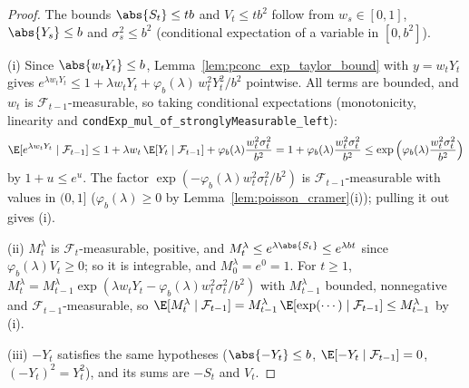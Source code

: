 \begin{proof}
\leanok
The bounds $\abs{S_t} \le tb$ and $V_t \le tb^2$ follow from $w_s \in [0, 1]$, $\abs{Y_s} \le b$
and $\sigma_s^2 \le b^2$ (conditional expectation of a variable in $[0, b^2]$).

(i) Since $\abs{w_t Y_t} \le b$, Lemma~\ref{lem:pconc_exp_taylor_bound} with $y = w_t Y_t$ gives
$e^{\lambda w_t Y_t} \le 1 + \lambda w_t Y_t + \varphi_b(\lambda)\, w_t^2 Y_t^2/b^2$ pointwise. All terms are
bounded, and $w_t$ is $\mathcal F_{t-1}$-measurable, so taking conditional expectations
(monotonicity, linearity and \texttt{condExp\_mul\_of\_stronglyMeasurable\_left}):
\[
  \E[e^{\lambda w_t Y_t} \mid \mathcal F_{t-1}] \le 1 + \lambda w_t\, \E[Y_t \mid \mathcal F_{t-1}] + \varphi_b(\lambda) \frac{w_t^2 \sigma_t^2}{b^2}
  = 1 + \varphi_b(\lambda) \frac{w_t^2 \sigma_t^2}{b^2} \le \exp\Big(\varphi_b(\lambda) \frac{w_t^2 \sigma_t^2}{b^2}\Big)
\]
by $1 + u \le e^u$. The factor $\exp(-\varphi_b(\lambda) w_t^2 \sigma_t^2/b^2)$ is
$\mathcal F_{t-1}$-measurable with values in $(0, 1]$ ($\varphi_b(\lambda) \ge 0$ by
Lemma~\ref{lem:poisson_cramer}(i)); pulling it out gives (i).

(ii) $M^\lambda_t$ is $\mathcal F_t$-measurable, positive, and
$M^\lambda_t \le e^{\lambda \abs{S_t}} \le e^{\lambda b t}$ since $\varphi_b(\lambda) V_t \ge 0$; so it is
integrable, and $M^\lambda_0 = e^0 = 1$. For $t \ge 1$,
$M^\lambda_t = M^\lambda_{t-1} \exp(\lambda w_t Y_t - \varphi_b(\lambda) w_t^2 \sigma_t^2/b^2)$ with
$M^\lambda_{t-1}$ bounded, nonnegative and $\mathcal F_{t-1}$-measurable, so
$\E[M^\lambda_t \mid \mathcal F_{t-1}] = M^\lambda_{t-1}\, \E[\exp(\cdots) \mid \mathcal F_{t-1}] \le M^\lambda_{t-1}$ by (i).

(iii) $-Y_t$ satisfies the same hypotheses ($\abs{-Y_t} \le b$, $\E[-Y_t \mid \mathcal F_{t-1}] = 0$,
$(-Y_t)^2 = Y_t^2$), and its sums are $-S_t$ and $V_t$.
\end{proof}

